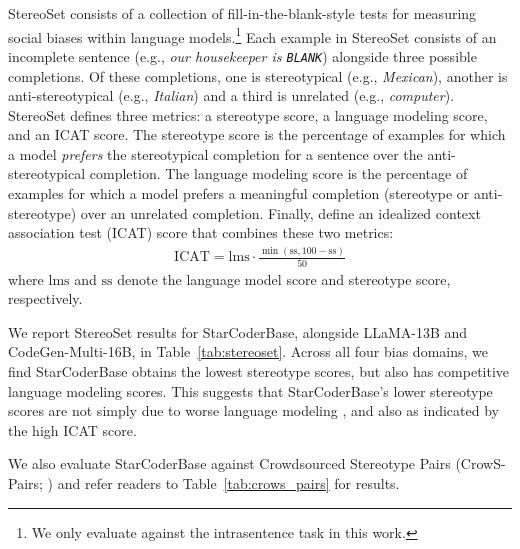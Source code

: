 \documentclass[10pt]{article} %
\begin{document}
StereoSet consists of a collection of fill-in-the-blank-style tests for measuring social biases within language models.\footnote{We only evaluate against the intrasentence task in this work.}
Each example in StereoSet consists of an incomplete sentence (e.g., \emph{our housekeeper is \texttt{BLANK}}) alongside three possible completions.
Of these completions, one is stereotypical (e.g., \emph{Mexican}), another is anti-stereotypical (e.g., \emph{Italian}) and a third is unrelated (e.g., \emph{computer}).
StereoSet defines three metrics: a stereotype score, a language modeling score, and an ICAT score.
The stereotype score is the percentage of examples for which a model \emph{prefers} the stereotypical completion for a sentence over the anti-stereotypical completion.
The language modeling score is the percentage of examples for which a model prefers a meaningful completion (stereotype or anti-stereotype) over an unrelated completion.
Finally, \citet{nadeem_stereoset_2021} define an idealized context association test (ICAT) score that combines these two metrics:
\begin{align}
 \mathrm{ICAT} = \mathrm{lms} \cdot \frac{\min(\mathrm{ss}, 100 - \mathrm{ss})}{50}
\end{align}
where $\mathrm{lms}$ and $\mathrm{ss}$  denote the language model score and stereotype score, respectively.

We report StereoSet results for StarCoderBase, alongside LLaMA-13B and CodeGen-Multi-16B, in Table~\ref{tab:stereoset}.
Across all four bias domains, we find StarCoderBase obtains the lowest stereotype scores, but also has competitive language modeling scores. 
This suggests that StarCoderBase's lower stereotype scores are not simply due to worse language modeling \citep{meade_empirical_2022}, and also as indicated by the high ICAT score.

We also evaluate StarCoderBase against Crowdsourced Stereotype Pairs (CrowS-Pairs; \citealt{nangia_crows-pairs_2020}) and refer readers to Table~\ref{tab:crows_pairs} for results.
\end{document}
